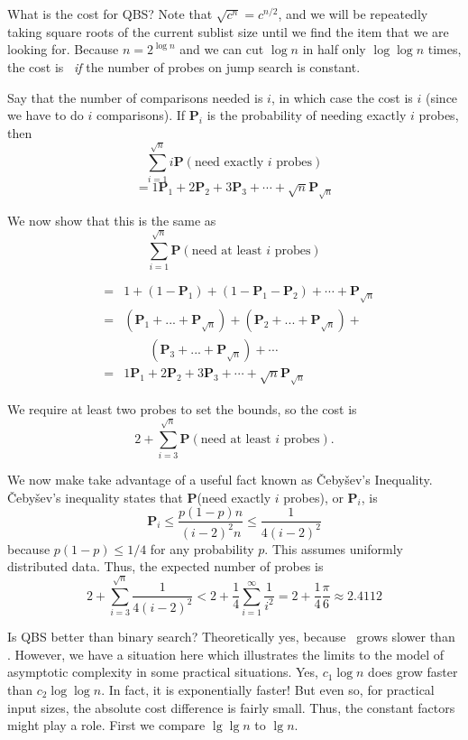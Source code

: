 What is the cost for QBS?
Note that \(\sqrt{c^n} =c^{n/2}\), and we will be repeatedly taking
square roots of the current sublist size until we find the item that
we are looking for.
Because \(n = 2^{\log n}\) and we can cut \(\log n\) in half only
\(\log \log n\) times, the cost is \Thetaloglogn\ \emph{if} the number
of probes on jump search is constant.

Say that the number of comparisons needed is \(i\), in which case the
cost is \(i\) (since we have to do \(i\) comparisons).
If \(\mathbf{P}_i\) is the probability of needing exactly \(i\)
probes, then
\[\sum_{i=1}^{\sqrt{n}} i \mathbf{P}(\mbox{need exactly $i$ probes})\]
\[= 1 \mathbf{P}_1 + 2 \mathbf{P}_2 + 3 \mathbf{P}_3 + \cdots +
\sqrt{n} \mathbf{P}_{\sqrt{n}}\]

\noindent We now show that this is the same as
\[\sum_{i=1}^{\sqrt{n}} \mathbf{P}(\mbox{need at least $i$ probes})\]

\begin{eqnarray*}
&=& 1 + (1-\mathbf{P}_1) + (1-\mathbf{P}_1-\mathbf{P}_2) +
\cdots + \mathbf{P}_{\sqrt{n}}\\
&=& (\mathbf{P}_1 + ... + \mathbf{P}_{\sqrt{n}}) +
    (\mathbf{P}_2 + ... + \mathbf{P}_{\sqrt{n}}) +\\
&& \qquad    (\mathbf{P}_3 + ... + \mathbf{P}_{\sqrt{n}}) + \cdots\\
&=& 1 \mathbf{P}_1 + 2 \mathbf{P}_2 + 3 \mathbf{P}_3 + \cdots +
\sqrt{n} \mathbf{P}_{\sqrt{n}}
\end{eqnarray*}

\noindent We require at least two probes to set the bounds, so the cost
is 
\[2 + \sum_{i=3}^{\sqrt{n}} \mathbf{P}(\mbox{need at least \(i\) probes}).\]

We now make take advantage of a useful fact known as \v{C}eby\v{s}ev's
Inequality.
\v{C}eby\v{s}ev's inequality states that
\(\mathbf{P}\)(need exactly \(i\) probes), or \(\mathbf{P}_i\), is
\[ \mathbf{P}_i \leq \frac{p(1 - p)n}{(i - 2)^2 n} \leq
\frac{1}{4(i-2)^2}\]
\noindent because \(p(1-p) \leq 1/4\) for any probability \(p\).
This assumes uniformly distributed data.
Thus, the expected number of probes is
\[2 + \sum_{i=3}^{\sqrt{n}} \frac{1}{4(i-2)^2}
< 2 + \frac{1}{4}\sum_{i=1}^\infty \frac{1}{i^2} =
2 + \frac{1}{4}\frac{\pi}{6} \approx 2.4112\]

Is QBS better than binary search?
Theoretically yes, because \Ologlogn\ grows slower than \Ologn.
However, we have a situation here which illustrates the limits to the
model of asymptotic complexity in some practical situations.
Yes, \(c_1 \log n\) does grow faster than \(c_2 \log \log n\).
In fact, it is exponentially faster!
But even so, for practical input sizes, the absolute cost difference
is fairly small.
Thus, the constant factors might play a role.
First we compare $\lg \lg n$ to $\lg n$.

